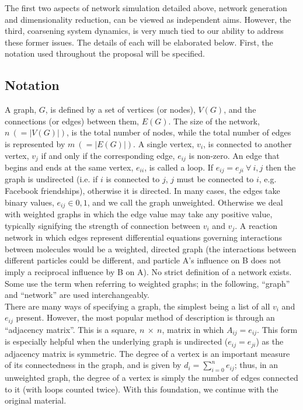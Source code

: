 \documentclass[11pt]{article}
\begin{document}
The first two aspects of network simulation detailed above, network generation and dimensionality reduction, can be viewed as independent aims. However, the third, coarsening system dynamics, is very much tied to our ability to address these former issues. The details of each will be elaborated below. First, the notation used throughout the proposal will be specified.
\subsection{Notation}
A graph, $G$, is defined by a set of vertices (or nodes), $V(G)$, and the connections (or edges) between them, $E(G)$. The size of the network, $n \ ( = |V(G)|)$, is the total number of nodes, while the total number of edges is represented by $m \ (= |E(G)|)$. A single vertex, $v_{i}$, is connected to another vertex, $v_{j}$ if and only if the corresponding edge, $e_{ij}$ is non-zero. An edge that begins and ends at the same vertex, $e_{ii}$, is called a loop. If $e_{ij} = e_{ji} \ \forall \ i,j$ then the graph is undirected (i.e. if $i$ is connected to $j$, $j$ must be connected to $i$, e.g. Facebook friendships), otherwise it is directed. In many cases, the edges take binary values, $e_{ij} \in {0,1}$, and we call the graph unweighted. Otherwise we deal with weighted graphs in which the edge value may take any positive value, typically signifying the strength of connection between $v_{i}$ and $v_{j}$. A reaction network in which edges represent differential equations governing interactions between molecules would be a weighted, directed graph (the interactions between different particles could be different, and particle A's influence on B does not imply a reciprocal influence by B on A). No strict definition of a network exists. Some use the term when referring to weighted graphs; in the following, ``graph'' and ``network'' are used interchangeably. \vspace{1mm}\\
There are many ways of specifying a graph, the simplest being a list of all $v_{i}$ and $e_{ij}$ present. However, the most popular method of description is through an ``adjacency matrix''. This is a square, $n \ \times \ n$, matrix in which $A_{ij}=e_{ij}$. This form is especially helpful when the underlying graph is undirected ($e_{ij}=e_{ji}$) as the adjacency matrix is symmetric. The degree of a vertex is an important measure of its connectedness in the graph, and is given by $d_{i}=\sum\limits_{i=0}^n e_{ij}$; thus, in an unweighted graph, the degree of a vertex is simply the number of edges connected to it (with loops counted twice). With this foundation, we continue with the original material.
\end{document}
